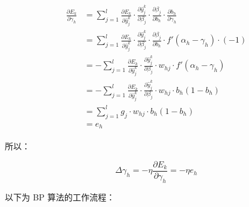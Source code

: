 \documentclass[../studies-ml.tex]{subfiles}
\begin{document}
\begin{align*}
  \begin{split}
    \frac{\partial E_k}{\partial \gamma_h} & = \sum_{j=1}^{l} \frac{\partial E_k}{\partial \hat{y}_j^k} \cdot
    \frac{\partial \hat{y}_j^k}{\partial \beta_j} \cdot \frac{\partial \beta_j}{\partial b_h} \cdot
    \frac{\partial b_h}{\partial \gamma_h} \\
    & = \sum_{j=1}^{l} \frac{\partial E_k}{\partial \hat{y}_j^k} \cdot
    \frac{\partial \hat{y}_j^k}{\partial \beta_j} \cdot \frac{\partial \beta_j}{\partial b_h} \cdot
    f'(\alpha_h - \gamma_h) \cdot (-1) \\
    & = -\sum_{j=1}^{l} \frac{\partial E_k}{\partial \hat{y}_j^k} \cdot
    \frac{\partial \hat{y}_j^k}{\partial \beta_j} \cdot w_{hj} \cdot f'(\alpha_h - \gamma_h) \\
    & = -\sum_{j=1}^{l} \frac{\partial E_k}{\partial \hat{y}_j^k} \cdot
    \frac{\partial \hat{y}_j^k}{\partial \beta_j} \cdot w_{hj} \cdot b_h (1 - b_h) \\
    & = \sum_{j=1}^{l} g_j \cdot w_{hj} \cdot b_h (1 - b_h) \\
    & = e_h
  \end{split}
\end{align*}

所以：

\[
  \Delta \gamma_h = -\eta \frac{\partial E_k}{\partial \gamma_h} = -\eta e_h
\]

\newpage
以下为 BP 算法的工作流程：
\end{document}
